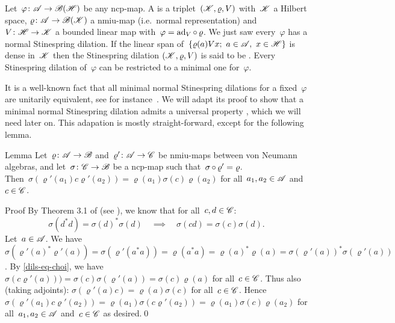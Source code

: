 \documentclass[b]{subfiles}
\begin{document}
\begin{parsec}%
Let~$\varphi\colon \mathscr{A} \to \mathscr{B}(\mathscr{H})$
    be any ncp-map.
A 
    is a triplet~$(\mathscr{K},\varrho, V)$
    with~$\mathscr{K}$ a Hilbert space,
    $\varrho\colon \mathscr{A} \to \mathscr{B}(\mathscr{K})$ a nmiu-map
        (i.e.~normal representation)
        and~$V\colon \mathscr{H} \to \mathscr{K}$ a bounded linear map
        with~$\varphi = \mathrm{ad}_V \mathop{\circ} \varrho$.
We just saw every~$\varphi$ has a normal Stinespring dilation.
If the linear span of~$\{ \varrho(a) Vx; \ a \in \mathscr{A},\ x\in \mathscr{H}\}$
is dense in~$\mathscr{K}$
then the Stinespring dilation $(\mathscr{K},\varrho,V)$ is said to be .
Every Stinespring dilation of~$\varphi$ can be restricted to a minimal one
    for~$\varphi$.
\begin{point}%
It is a well-known fact that all minimal normal Stinespring dilations
    for a fixed~$\varphi$ are unitarily equivalent,
    see for instance~\cite[Proposition 4.2]{paulsen}.
We will adapt its proof to show that a minimal normal Stinespring
    dilation admits a universal property \TODO{},
    which we will need later on.
This adapation is mostly straight-forward, except for the following lemma.
\end{point}
\begin{point}{Lemma}%
Let~$\varrho\colon \mathscr{A} \to \mathscr{B}$ and~$\varrho'\colon \mathscr{A} \to \mathscr{C}$
    be nmiu-maps between von Neumann algebras,
        and let~$\sigma \colon \mathscr{C} \to \mathscr{B}$ be a ncp-map
        such that~$\sigma \mathop{\circ} \varrho' = \varrho$.\\
Then~$\sigma(\varrho'(a_1)c \varrho'(a_2)) =  \varrho(a_1) \sigma(c) \varrho(a_2)$
    for all~$a_1,a_2 \in \mathscr{A}$ and~$c \in \mathscr{C}$.
\begin{point}{Proof}%
By Theorem 3.1 of \cite{choi} (see ),
we know that for all~$c,d\in\mathscr{C}$:
\begin{equation}
    \sigma(d^*d) = \sigma(d)^*\sigma(d) \quad \implies \quad
    \sigma(cd) = \sigma(c)\sigma(d).\label{dils-eq-choi}
\end{equation}
Let~$a \in \mathscr{A}$.
We have~$\sigma(\varrho'(a)^* \varrho'(a))
    = \sigma(\varrho'(a^*a))
    = \varrho(a^*a)
    = \varrho(a)^*\varrho(a)
    = \sigma(\varrho'(a))^*\sigma(\varrho'(a))$.
By \eqref{dils-eq-choi},
    we have~$\sigma(c\varrho'(a)))
        = \sigma(c)\sigma(\varrho'(a)) = \sigma(c)\varrho(a)$
        for all~$c \in \mathscr{C}$.
Thus also (taking adjoints):
$\sigma(\varrho'(a)c) = \varrho(a)\sigma(c)$ for all~$c \in \mathscr{C}$.
Hence~$\sigma(\varrho'(a_1)c\varrho'(a_2))
            = \varrho(a_1)\sigma(c \varrho'(a_2))
            = \varrho(a_1) \sigma(c) \varrho(a_2)$
    for all~$a_1,a_2 \in \mathscr{A}$ and~$c\in \mathscr{C}$ as desired.\qed
\end{point}
\end{point}
\end{parsec}
\end{document}
